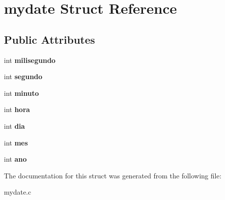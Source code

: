 \hypertarget{structmydate}{}\section{mydate Struct Reference}
\label{structmydate}
\subsection*{Public Attributes}
\begin{DoxyCompactItemize}
\item 
int {\bfseries milisegundo}\hypertarget{structmydate_ad6b1ce15ca00fd8e5caaad68695f3972}{}\label{structmydate_ad6b1ce15ca00fd8e5caaad68695f3972}

\item 
int {\bfseries segundo}\hypertarget{structmydate_a6396b8d527c6841ee14e10d84585ba5b}{}\label{structmydate_a6396b8d527c6841ee14e10d84585ba5b}

\item 
int {\bfseries minuto}\hypertarget{structmydate_a7c5d3ac8b1715bfe797c12ed7c12d3ff}{}\label{structmydate_a7c5d3ac8b1715bfe797c12ed7c12d3ff}

\item 
int {\bfseries hora}\hypertarget{structmydate_a5c468292b93174d1a4f94cf48f999f7c}{}\label{structmydate_a5c468292b93174d1a4f94cf48f999f7c}

\item 
int {\bfseries dia}\hypertarget{structmydate_a3a0d15b459386e0a7b510a5023ec18b7}{}\label{structmydate_a3a0d15b459386e0a7b510a5023ec18b7}

\item 
int {\bfseries mes}\hypertarget{structmydate_a02d99075a74d3101b000737518391b28}{}\label{structmydate_a02d99075a74d3101b000737518391b28}

\item 
int {\bfseries ano}\hypertarget{structmydate_a59f82763629debf71c5dae4b63fb4c86}{}\label{structmydate_a59f82763629debf71c5dae4b63fb4c86}

\end{DoxyCompactItemize}


The documentation for this struct was generated from the following file\+:\begin{DoxyCompactItemize}
\item 
mydate.\+c\end{DoxyCompactItemize}
